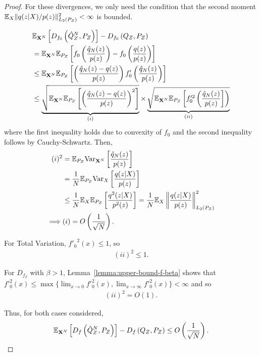 \begin{proof}
For these divergences, we only need the condition that the second moment $\mathbb{E}_X \| q(z|X)/p(z)\|^2_{L_2(P_Z)} < \infty$ is bounded.

\begin{align*}
    & \mathbb{E}_{\mathbf{X}^N} \left[ D_{f_0}\left( \hat{Q}_Z^N , P_Z\right)\right] - D_{f_0}\left( Q_{Z} , P_Z\right)  \\
    &= \mathbb{E}_{\mathbf{X}^N}\mathbb{E}_{P_Z} \left[ f_0\left( \frac{\hat{q}_N(z)}{p(z)} \right) - f_0\left( \frac{q(z)}{p(z)} \right) \right] \\
    &\leq \mathbb{E}_{\mathbf{X}^N}\mathbb{E}_{P_Z} \left[ \left( \frac{\hat{q}_N(z) - q(z)}{p(z)} \right)     f_0'\left(\frac{\hat{q}_N(z)}{p(z)} \right) \right]  \\
    &\leq \underbrace{ \sqrt{ \mathbb{E}_{\mathbf{X}^N}\mathbb{E}_{P_Z} \left[\left( \frac{\hat{q}_N(z) - q(z)}{p(z)} \right)^2\right] }}_{(i)} 
    \times 
    \underbrace{\sqrt{\mathbb{E}_{\mathbf{X}^N}\mathbb{E}_{P_Z} \left[ f_0'^2\left(\frac{\hat{q}_N(z)}{p(z)}\right] \right) }}_{(ii)}
\end{align*}
where the first inequality holds due to convexity of $f_0$ and the second inequality follows by Cauchy-Schwartz.
Then,
\begin{align*}
    (i)^2 
    &= \mathbb{E}_{P_Z} \text{Var}_{\mathbf{X}^N}\left[\frac{\hat{q}_N(z)}{p(z)} \right]\\
    &= \frac{1}{N}\mathbb{E}_{P_Z} \text{Var}_{X}\left[\frac{q(z|X)}{p(z)} \right]\\
    &\leq \frac{1}{N}\mathbb{E}_{X} \mathbb{E}_{P_Z} \left[ \frac{q^2(z|X)}{p^2(z)} \right] = \frac{1}{N} \mathbb{E}_X \left\| \frac{q(z|X)}{p(z)} \right\|^2_{L_2(P_Z)}\\
    \implies & (i) = O\left(\frac{1}{\sqrt{N}}\right).
\end{align*}

For Total Variation, ${f'_0}^2(x) \leq 1$, so
\begin{align*}
    (ii)^2 \leq 1.
\end{align*}

For $D_{f_\beta}$ with $\beta>1$, Lemma~\ref{lemma:upper-bound-f-beta} shows that $f'^2_0(x) \leq \max\{\lim_{x\to 0}f'^2_0(x), \lim_{x\to \infty}f'^2_0(x)\} < \infty$ and so 
\begin{align*}
    (ii)^2 = O(1).
\end{align*}

Thus, for both cases considered,
\begin{align*}
    \mathbb{E}_{\mathbf{X}^N} \left[ D_f\left( \hat{Q}_Z^N , P_Z\right)\right] - D_f\left( Q_{Z} , P_Z\right) \leq O\left( \frac{1}{\sqrt{N}} \right).
\end{align*}


\end{proof}
